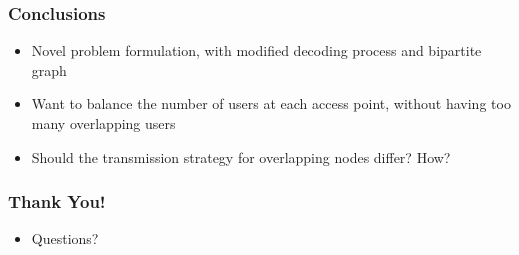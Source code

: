 \documentclass{beamer}
\begin{document}
\begin{frame}
\frametitle{Conclusions}
\begin{itemize}
\item Novel problem formulation, with modified decoding process and bipartite graph
\item Want to balance the number of users at each access point, without having too many overlapping users
\item Should the transmission strategy for overlapping nodes differ? How?
\begin{center}
  \scalebox{0.8}{}
  \end{center}
\end{itemize}
\end{frame}


\begin{frame}
\frametitle{ Thank You! }
\begin{itemize}
  \item Questions?
\end{itemize}
\end{frame}
\end{document}
